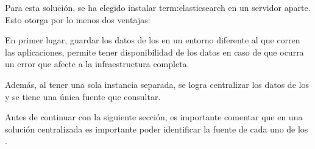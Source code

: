 Para esta solución, se ha elegido instalar \gls{term:elasticsearch} en un
servidor aparte. Esto otorga por lo menos dos ventajas:

En primer lugar, guardar los datos de los  en un entorno diferente al
que corren las aplicaciones, permite tener disponibilidad de los datos en
caso de que ocurra un error que afecte a la infraestructura completa.

Además, al tener una sola instancia separada, se logra centralizar los datos de
los  y se tiene una única fuente que consultar.

Antes de continuar con la siguiente sección, es importante comentar que en
una solución centralizada es importante poder identificar la fuente de cada uno
de los .
